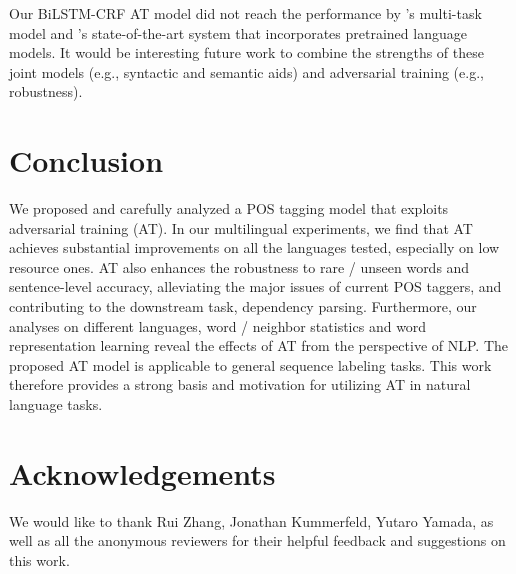 \documentclass[11pt,a4paper]{article}
\begin{document}
Our BiLSTM-CRF AT model did not reach the performance by 's multi-task model and
's 
state-of-the-art system that incorporates pretrained language models. 
It would be interesting future work to combine the strengths of these joint models (e.g., syntactic and semantic aids) and adversarial training (e.g., robustness).



\section{Conclusion}
We proposed and carefully analyzed a POS tagging model that exploits adversarial training (AT).
In our multilingual experiments, we find that AT achieves substantial improvements on all the languages tested, especially on low resource ones.
AT also enhances the robustness to rare \!/\! unseen words and sentence-level accuracy, alleviating the major issues of current POS taggers, and contributing to the downstream task, dependency parsing.
Furthermore, our analyses on different languages, word \!/\! neighbor statistics and word representation learning reveal the effects of AT from the perspective of NLP.
The proposed AT model is applicable to general sequence labeling tasks.
This work therefore 
provides a strong basis and motivation for utilizing AT in natural language tasks.



\section*{Acknowledgements}

We would like to thank Rui Zhang, Jonathan Kummerfeld, Yutaro Yamada, as well as all the anonymous reviewers for their helpful feedback and suggestions on this work.







\clearpage


\end{document}
